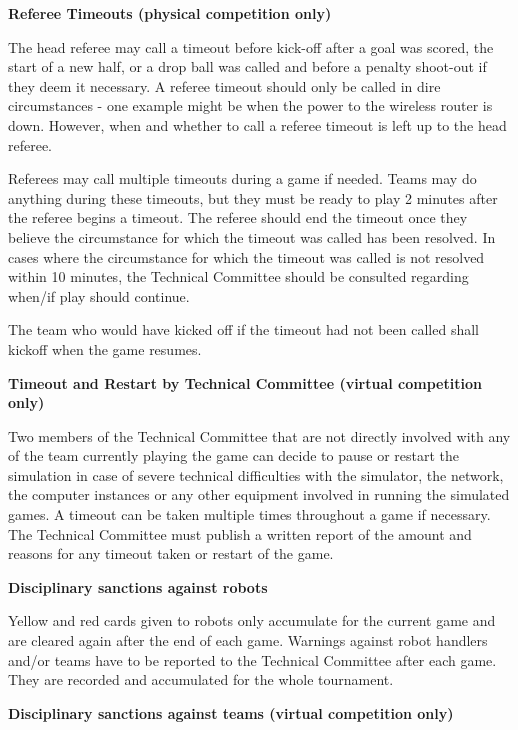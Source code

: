 \bigskip

{\bfseries Referee Timeouts (physical competition only)}

The head referee may call a timeout before kick-off after a goal was scored,
the start of a new half, or a drop ball was called and before a penalty
shoot-out if they deem it necessary.
A referee timeout should only be called in dire circumstances -
one example might be when the power to the wireless router is down.
However, when and whether to call a referee timeout is left up to the head referee.

Referees may call multiple timeouts during a game if needed. Teams may do anything during these timeouts, but they must be ready to play 2 minutes after the referee begins a timeout. The referee should end the timeout once they believe the circumstance for which the timeout was called has been resolved. In cases where the circumstance for which the timeout was called is not resolved within 10 minutes, the Technical Committee should be consulted regarding when/if play should continue.

The team who would have kicked off if the timeout had not been called shall kickoff when the game resumes.

\bigskip

{\bfseries Timeout and Restart by Technical Committee (virtual competition only)}

Two members of the Technical Committee that are not directly involved with any of the team currently playing the game can decide to pause or restart the simulation in case of severe technical difficulties with the simulator, the network, the computer instances or any other equipment involved in running the simulated games. A timeout can be taken multiple times throughout a game if necessary. The Technical Committee must publish a written report of the amount and reasons for any timeout taken or restart of the game.

\bigskip

{\bfseries Disciplinary sanctions against robots}

Yellow and red cards given to robots only accumulate for the current game and are cleared again after the end of each game. Warnings against robot handlers and/or teams have to be reported to the Technical Committee after each game. They are recorded and accumulated for the whole tournament.

\bigskip

{\bfseries Disciplinary sanctions against teams (virtual competition only)}

